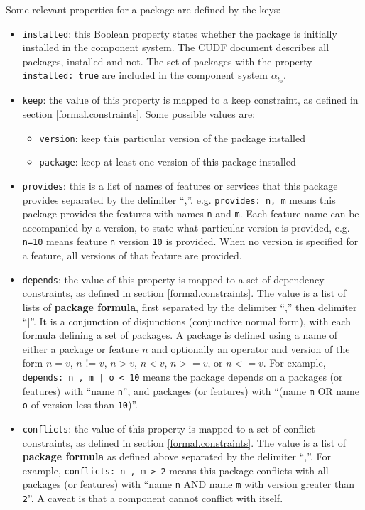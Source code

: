 Some relevant properties for a package are defined by the keys:
\begin{itemize}
  \item \verb+installed+: this Boolean property states whether the package is initially installed in the component system. 
  The CUDF document describes all packages, installed and not. 
  The set of packages with the property \verb+installed: true+ are included in the component system $\alpha_{t_{0}}$.
  \item \verb+keep+: the value of this property is mapped to a keep constraint, as defined in section \ref{formal.constraints}.
  Some possible values are:
	  	\begin{itemize}
	  		\item \verb+version+: keep this particular version of the package installed
	  		\item \verb+package+: keep at least one version of this package installed
		\end{itemize}
  \item \verb+provides+: this is a list of names of features or services that this package provides separated by the delimiter ``,''.
  e.g. \verb+provides: n, m+ means this package provides the features with names \verb+n+ and \verb+m+.
  Each feature name can be accompanied by a version, to state what particular version is provided, e.g. \verb+n=10+ means feature \verb+n+ version \verb+10+ is provided.
  When no version is specified for a feature, all versions of that feature are provided.
  \item \verb+depends+: the value of this property is mapped to a set of dependency constraints, as defined in section \ref{formal.constraints}.
  The value is a list of lists of \textbf{package formula}, first separated by the delimiter ``,'' then delimiter ``|''.
  It is a conjunction of disjunctions (conjunctive normal form), with each formula defining a set of packages.
  A package is defined using a name of either a package or feature $n$ and optionally an operator and version of the form  $n = v$, $n$ != $v$, $n > v$, $n < v$, $n >= v$, or $n <= v$.
  For example, \verb+depends: n , m | o < 10+ means the package depends on a packages (or features) with ``name \verb+n+'',
   and  packages (or features) with ``(name \verb+m+ OR name \verb+o+ of version less than \verb+10+)''.  
  \item \verb+conflicts+: the value of this property is mapped to a set of conflict constraints, as defined in section \ref{formal.constraints}.
  The value is a list of \textbf{package formula} as defined above separated by the delimiter ``,''.
  For example, \verb+conflicts: n , m > 2+ means this package conflicts with all packages (or features) with ``name \verb+n+ AND name \verb+m+ with version greater than \verb+2+''.
  A caveat is that a component cannot conflict with itself.
\end{itemize}

